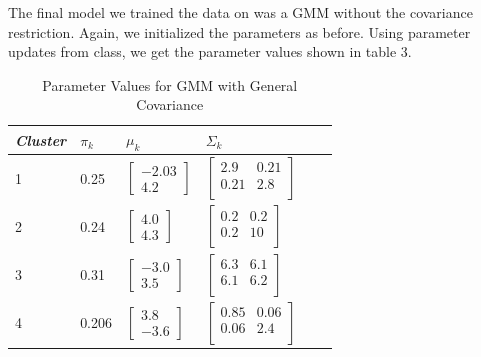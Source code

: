 \documentclass[paper=a4, fontsize=11pt]{scrartcl} %
\numberwithin{equation}{section} %
\numberwithin{figure}{section} %
\numberwithin{table}{section} %
\begin{document}
The final model we trained the data on was a GMM without the covariance restriction. Again, we initialized the parameters as before. Using parameter updates from class, we get the parameter values shown in table 3.

	\begin{table}
		\caption {Parameter Values for GMM with General Covariance} \label{tab:title} 
		\begin{center}		
			\begin{tabular}{*6l}   
				\toprule
				\emph{Cluster}&  $\pi_k$ & $\mu_k$ & $\Sigma_k$\\\midrule
				1 & 0.25
				& $\begin{bmatrix} -2.03 \\ 4.2\end{bmatrix}$  
				& $\begin{bmatrix}
				2.9 & 0.21 \\
				0.21 & 2.8 \\ \end{bmatrix}$\\
				2 & 0.24 
				& $\begin{bmatrix}4.0 \\ 4.3\end{bmatrix}$ 
				& $\begin{bmatrix}
				0.2 & 0.2 \\
				0.2 & 10 \\ \end{bmatrix}$\\
				3 & 0.31
				& $\begin{bmatrix}-3.0 \\ 3.5\end{bmatrix}$ 
				& $\begin{bmatrix}
				6.3 & 6.1 \\
				6.1 &  6.2 \\ \end{bmatrix}$\\	
				4 & 0.206
				& $\begin{bmatrix}3.8 \\-3.6 \end{bmatrix}$ 
				& $\begin{bmatrix}
				0.85 & 0.06 \\
				0.06 &  2.4 \\ \end{bmatrix}$	
				\\\bottomrule
				\hline
			\end{tabular}
		\end{center}
	\end{table}
\end{document}
